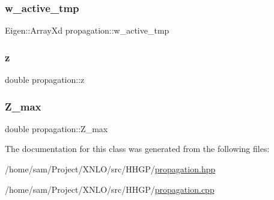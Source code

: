 \subsubsection{\texorpdfstring{w\+\_\+active\+\_\+tmp}{w\_active\_tmp}}
{\footnotesize\ttfamily Eigen\+::\+Array\+Xd propagation\+::w\+\_\+active\+\_\+tmp\hspace{0.3cm}{\ttfamily [private]}}

\mbox{\label{classpropagation_aeacfc091fafd1fdb1af4536f6f587e55}} 
\subsubsection{\texorpdfstring{z}{z}}
{\footnotesize\ttfamily double propagation\+::z}

\mbox{\label{classpropagation_ae0b2d1a8fa0e59d37e124a0ba1f12dd2}} 
\subsubsection{\texorpdfstring{Z\+\_\+max}{Z\_max}}
{\footnotesize\ttfamily double propagation\+::\+Z\+\_\+max\hspace{0.3cm}{\ttfamily [private]}}



The documentation for this class was generated from the following files\+:\begin{DoxyCompactItemize}
\item 
/home/sam/\+Project/\+X\+N\+L\+O/src/\+H\+H\+G\+P/\hyperlink{propagation_8hpp}{propagation.\+hpp}\item 
/home/sam/\+Project/\+X\+N\+L\+O/src/\+H\+H\+G\+P/\hyperlink{propagation_8cpp}{propagation.\+cpp}\end{DoxyCompactItemize}
